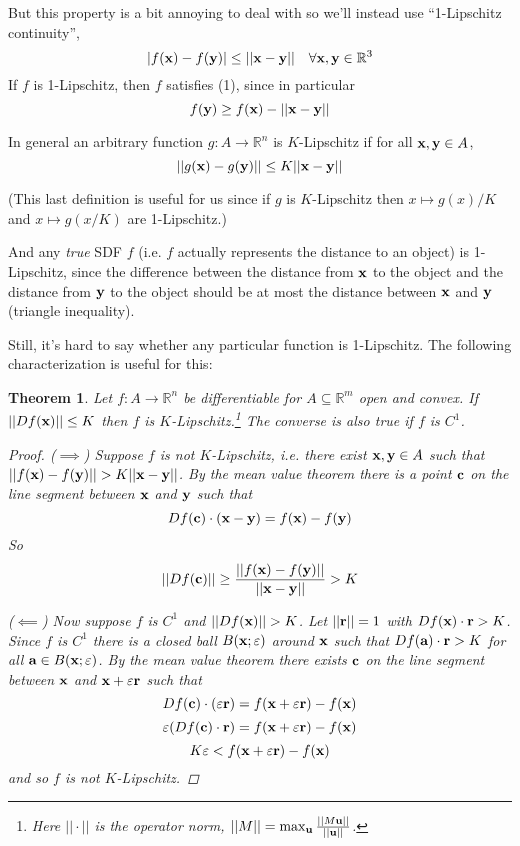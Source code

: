 \documentclass{article}
\newcommand\bb\mathbb
\newcommand\ve\varepsilon
\renewcommand\vec\textbf
\newtheorem{theorem}{Theorem}
\begin{document}
But this property is a bit annoying to deal with
so we'll instead use ``1-Lipschitz continuity'',
$$|f(\vec x) - f(\vec y)| \leq ||\vec x - \vec y||~~~\forall \vec x,\vec y\in\bb R^3$$
If $f$ is 1-Lipschitz, then $f$ satisfies (1),
since in particular
$$f(\vec y) \geq f(\vec x) - ||\vec x-\vec y||$$

In general an arbitrary function $g:A \to\bb R^n$ is
$K$-Lipschitz if for all $\vec x,\vec y\in A$,
$$||g(\vec x) - g(\vec y)|| \leq K||\vec x-\vec y||$$

(This last definition is useful for us since if $g$ is $K$-Lipschitz
then $x\mapsto g(x)/K$ and $x\mapsto g(x/K)$ are 1-Lipschitz.)

And any {\em true} SDF $f$ (i.e. $f$ actually represents
the distance to an object) is 1-Lipschitz, since the difference
between the distance from $\vec x$ to the object and the distance
from $\vec y$ to the object should be at most the distance between
$\vec x$ and $\vec y$ (triangle inequality).

Still, it's hard to say whether any particular function is
1-Lipschitz. The following characterization is useful for this:

\begin{theorem}
\label{diff-lipschitz}
Let $f:A\to\bb R^n$ be differentiable for $A\subseteq \bb R^m$ open and convex.
If $||Df(\vec x)||\leq K$ then $f$ is $K$-Lipschitz.\footnote{Here
$||\cdot||$ is the operator norm, $||M|| = \max_{\vec u} \frac{||M\vec u||}{||\vec u||}$.}
The converse is also true if $f$ is $C^1$.
\begin{proof}
($\implies$) Suppose $f$ is not $K$-Lipschitz, i.e. there exist $\vec x,\vec y\in A$ such that
$||f(\vec x)-f(\vec y)|| >  K ||\vec x-\vec y||$. By the mean value theorem there is a point $\vec c$
on the line segment between $\vec x$ and $\vec y$ such that
$$Df(\vec c)\cdot (\vec x-\vec y) = f(\vec x) - f(\vec y)$$
So
$$||Df(\vec c)|| \geq  \frac{||f(\vec x) - f(\vec y)||}{||\vec x-\vec y||} > K$$

($\impliedby$) Now suppose $f$ is $C^1$ and $||Df(\vec x)|| > K$.
Let $||\vec r|| = 1$ with $Df(\vec x)\cdot \vec r > K$.
Since $f$ is $C^1$ there is a closed ball $B(\vec x;\ve)$ around $\vec x$ such that
$Df(\vec a)\cdot \vec r > K$ for all $\vec a\in B(\vec x;\ve)$.
By the mean value theorem there exists $\vec c$ on the line segment between $\vec x$ and $\vec x+\ve\vec r$
such that
$$Df(\vec c)\cdot (\ve\vec r) = f(\vec x+\ve\vec r) - f(\vec x)$$
$$\ve (Df(\vec c)\cdot \vec r) = f(\vec x+\ve\vec r) - f(\vec x)$$
$$K\ve < f(\vec x+\ve\vec r) - f(\vec x)$$
and so $f$ is not $K$-Lipschitz.
\end{proof}
\end{theorem}
\end{document}
